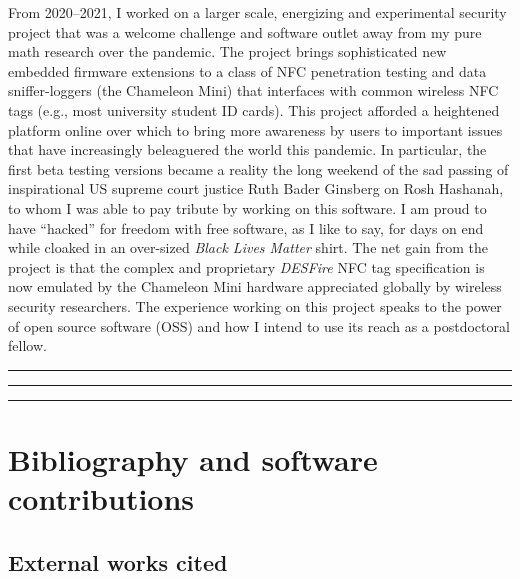 \documentclass[10pt,reqno,letterpaper]{article}
\theoremstyle{plain}
\numberwithin{theorem}{section}
\theoremstyle{definition}
\renewcommand{\thesection}{\arabic{section}}
\begin{document}
From 2020--2021, I worked on a larger scale, energizing and experimental 
security project that was a welcome challenge and software outlet away 
from my pure math research over the pandemic. 
The project brings sophisticated new 
embedded firmware extensions to a class of NFC penetration testing and 
data sniffer-loggers 
(the Chameleon Mini) that interfaces with common wireless NFC tags (e.g., most university student ID cards). 
This project afforded a heightened platform online 
over which to bring 
more awareness by users to important issues 
that have increasingly beleaguered the world this pandemic. 
In particular, the first beta testing versions became a reality 
the long weekend of the sad passing of inspirational 
US supreme court justice Ruth Bader Ginsberg on 
Rosh Hashanah, to whom I was able to pay tribute by working on this software. 
I am proud to have ``hacked'' for freedom with free software, as I like to say, for days on end 
while cloaked in an over-sized \emph{Black Lives Matter} shirt. 
The net gain from the project is that the complex and proprietary \emph{DESFire} NFC tag
specification is now emulated by the Chameleon Mini hardware appreciated globally by 
wireless security researchers.  
The experience working on this project speaks to the power of 
open source software (OSS) and how I intend to use its reach as a postdoctoral fellow.

\bigskip\hrule\hrule\hrule\bigskip
\renewcommand{\thesection}{B}
\section{Bibliography and software contributions} 
\label{page_Section_BibliographyB} 

\vskip 0.1in
\subsection{External works cited}
\end{document}
